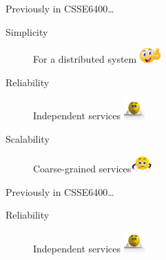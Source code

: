 \documentclass{slide}
\begin{document}







\begin{frame}{Previously in CSSE6400\dots}
    \vspace{1mm}
    {\LARGE
    \begin{description}
        \item[Simplicity] For a distributed system \tabto{15em}\includegraphics[width=8mm]{../../shared/images/thumbs-up.png}
        \item[Reliability] Independent services \tabto{15em}\includegraphics[trim=57 145 70 85,clip,width=8mm]{../../shared/images/neutral.png}
        \item[Scalability] Coarse-grained services\tabto{15em}\includegraphics[trim=22 19 22 12,clip,width=8mm]{../../shared/images/thumbs-down.png}
    \end{description}
    }
\end{frame}

\begin{frame}{Previously in CSSE6400\dots}
    \vspace{1mm}
    {\LARGE
    \begin{description}
        \item[Reliability] Independent services \tabto{15em}\includegraphics[trim=57 145 70 85,clip,width=8mm]{../../shared/images/neutral.png}
     \end{description}
    }
\end{frame}
\end{document}
